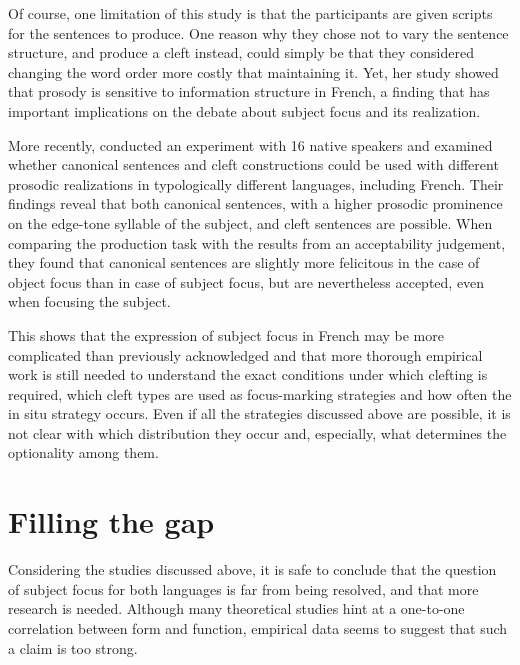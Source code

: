 Of course, one limitation of this study is that the participants are given scripts for the sentences to produce. One reason why they chose not to vary the sentence structure, and produce a cleft instead, could simply be that they considered changing the word order more costly that maintaining it. Yet, her study showed that prosody is sensitive to information structure in French, a finding that has important implications on the debate about subject focus and its realization.

More recently, \textcite{greif2021correction} conducted an experiment with 16 native speakers and examined whether canonical sentences and cleft constructions could be used with different prosodic realizations in typologically different languages, including French. Their findings reveal that both canonical sentences, with a higher prosodic prominence on the edge-tone syllable of the subject, and cleft sentences are possible. When comparing the production task with the results from an acceptability judgement, they found that canonical sentences are slightly more felicitous in the case of object focus than in case of subject focus, but are nevertheless accepted, even when focusing the subject.

This shows that the expression of subject focus in French may be more complicated than previously acknowledged and that more thorough empirical work is still needed to understand the exact conditions under which clefting is required, which cleft types are used as focus-marking strategies and how often the in situ strategy occurs. Even if all the strategies discussed above are possible, it is not clear with which distribution they occur and, especially, what determines the optionality among them.

\section{Filling the gap} \label{sub:3.4}
 
Considering the studies discussed above, it is safe to conclude that the question of subject focus for both languages is far from being resolved, and that more research is needed. Although many theoretical studies hint at a one-to-one correlation between form and function, empirical data seems to suggest that such a claim is too strong. 


